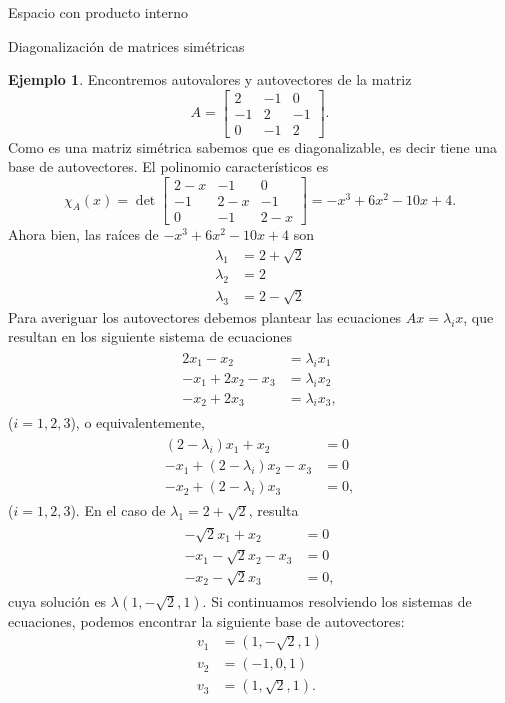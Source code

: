 \documentclass[a4paper,12pt,twoside,spanish,reqno]{amsbook}
\theoremstyle{definition}
\newtheorem{ejemplo}{Ejemplo}[section]
\theoremstyle{remark}
\begin{document}
\begin{chapter}{Espacio con producto interno}
\begin{section}{Diagonalización de matrices simétricas}
	\begin{ejemplo} Encontremos autovalores y autovectores de  la matriz
		\begin{equation*}
			A = \begin{bmatrix} 2&-1&0\\-1&2&-1\\0&-1&2 \end{bmatrix}.
		\end{equation*}
		Como es una matriz simétrica sabemos que es diagonalizable, es decir tiene una base de autovectores. 
		El polinomio característicos es
		\begin{equation*}
			\chi_A(x) = \det  \begin{bmatrix} 2-x&-1&0\\-1&2-x&-1\\0&-1&2-x \end{bmatrix} =	-x^3 + 6 x^2 - 10 x + 4.
		\end{equation*}
		Ahora bien, las raíces de $-x^3 + 6 x^2 - 10 x + 4 $  son 
		\begin{align*}
			\lambda_1 &= 2 + \sqrt 2 \\
			\lambda_2 &= 2 \\
			\lambda_3 &= 2 - \sqrt 2
		\end{align*}
		Para averiguar los autovectores debemos plantear las ecuaciones $Ax = \lambda_ix$,  que resultan en los siguiente sistema de ecuaciones
		\begin{align*}
		\begin{split}
		2x_1 - x_2  &= \lambda_i x_1 \\
		-x_1 + 2x_2 -x_3 &=\lambda_ix_2 \\
		-x_2 + 2x_3 &= \lambda_ix_3,  
		\end{split}
		\end{align*}
		($i=1,2,3$),  o equivalentemente,
		\begin{align*}
		\begin{split}
		(2 -\lambda_i)x_1+ x_2  &= 0 \\
		-x_1 +(2-\lambda_i)x_2  -x_3 &=0 \\
		-x_2 + (2-\lambda_i)x_3 &= 0,  
		\end{split}
		\end{align*}
		($i=1,2,3$).
		En el caso de $\lambda_1= 2 + \sqrt 2$,  resulta
		\begin{align*}
		\begin{split}
		-\sqrt 2x_1+ x_2  &= 0 \\
		-x_1 -\sqrt 2x_2  -x_3 &=0 \\
		-x_2 -\sqrt 2x_3 &= 0,  
		\end{split}
		\end{align*}
		cuya solución es $\lambda(1, -\sqrt2, 1)$. Si continuamos resolviendo los sistemas de ecuaciones, podemos encontrar la siguiente base de autovectores:
		\begin{align*}
		v_1 &= (1, -\sqrt2, 1) \\		
		v_2 &= (-1, 0, 1) \\		
		v_3 &= (1, \sqrt2, 1).
		\end{align*}
		

\end{ejemplo}
\end{section}
\end{chapter}
\end{document}
